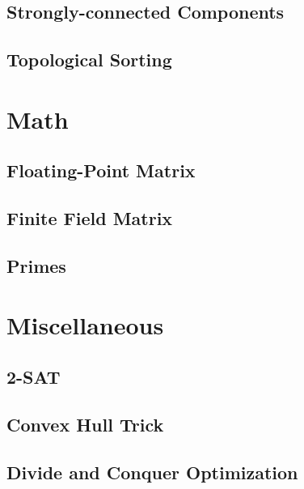 \subsection{Strongly-connected Components}
\raggedbottom
\hrulefill
\subsection{Topological Sorting}
\raggedbottom
\hrulefill

\section{Math}
\subsection{Floating-Point Matrix}
\raggedbottom
\hrulefill
\subsection{Finite Field Matrix}
\raggedbottom
\hrulefill
\subsection{Primes}
\raggedbottom
\hrulefill

\section{Miscellaneous}
\subsection{2-SAT}
\raggedbottom
\hrulefill
\subsection{Convex Hull Trick}
\raggedbottom
\hrulefill
\subsection{Divide and Conquer Optimization}
\raggedbottom
\hrulefill
